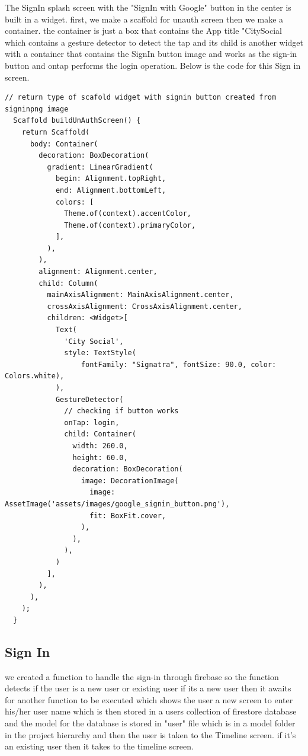 The SignIn splash screen with the "SignIn with Google" button in the center is built in a widget. first, we make a scaffold for unauth screen then we make a container. the container is just a box that contains the App title "CitySocial which contains a gesture detector to detect the tap and its child is another widget with a container that contains the SignIn button image and works as the sign-in button and ontap performs the login operation. Below is the code for this Sign in screen.

\begin{verbatim}
// return type of scafold widget with signin button created from signinpng image
  Scaffold buildUnAuthScreen() {
    return Scaffold(
      body: Container(
        decoration: BoxDecoration(
          gradient: LinearGradient(
            begin: Alignment.topRight,
            end: Alignment.bottomLeft,
            colors: [
              Theme.of(context).accentColor,
              Theme.of(context).primaryColor,
            ],
          ),
        ),
        alignment: Alignment.center,
        child: Column(
          mainAxisAlignment: MainAxisAlignment.center,
          crossAxisAlignment: CrossAxisAlignment.center,
          children: <Widget>[
            Text(
              'City Social',
              style: TextStyle(
                  fontFamily: "Signatra", fontSize: 90.0, color: Colors.white),
            ),
            GestureDetector(
              // checking if button works
              onTap: login,
              child: Container(
                width: 260.0,
                height: 60.0,
                decoration: BoxDecoration(
                  image: DecorationImage(
                    image: AssetImage('assets/images/google_signin_button.png'),
                    fit: BoxFit.cover,
                  ),
                ),
              ),
            )
          ],
        ),
      ),
    );
  }
\end{verbatim}

\subsection{Sign In}
we created a function to handle the sign-in through firebase so the function detects if the user is a new user or existing user if its a new user then it awaits for another function to be executed which shows the user a new screen to enter his/her user name which is then stored in a users collection of firestore database and the model for the database is stored in "user" file which is in a model folder in the project hierarchy and then the user is taken to the Timeline screen. if it's an existing user then it takes to the timeline screen.

